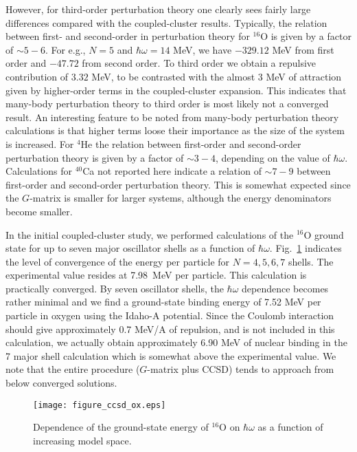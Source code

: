 \documentclass[twoside,12pt]{article}
\begin{document}
However, for third-order perturbation theory one clearly sees fairly large
differences compared with the coupled-cluster results.
Typically, the relation between first- and second-order in perturbation theory
for  $^{16}$O is given by a factor of $\sim 5-6$. For e.g., $N=5$ and
$\hbar\omega=14$ MeV, we have $-329.12$ MeV from first order and $-47.72$
from second order. To third order we obtain a repulsive contribution of
$3.32$ MeV, to be contrasted with the almost $3$ MeV of attraction given
by higher-order terms in the coupled-cluster expansion. This indicates that
many-body perturbation theory to third order is
most likely not a converged result. An interesting feature to be noted from
many-body perturbation theory calculations is that higher terms loose their
importance as the size of the system is increased. For
$^{4}$He the relation between first-order and second-order perturbation theory
is given by a factor of $\sim 3-4$, depending on the value of $\hbar\omega$.
Calculations for $^{40}$Ca not reported here indicate a relation of
$\sim 7-9$ between first-order and second-order perturbation theory.
This is somewhat expected since the $G$-matrix is smaller for larger
systems, although the energy denominators become smaller.

In the initial coupled-cluster study, we performed calculations of 
the $^{16}$O ground state for up to seven major oscillator 
shells as a function of $\hbar\omega$. 
Fig.~\ref{fig_ox_hw} indicates the level of convergence
of the energy per particle for $N=4,5,6,7$ shells. The experimental value
resides at 7.98~MeV per particle.  This calculation is practically converged.
By seven oscillator shells, the $\hbar\omega$ dependence becomes rather
minimal and we find a ground-state binding energy of 7.52 MeV per particle in
oxygen using the Idaho-A potential. Since the Coulomb interaction should give
approximately 0.7 MeV/A of repulsion, and is not included in this
calculation, we actually obtain approximately 6.90 MeV of nuclear binding
in the 7 major shell calculation which is somewhat above the experimental
value. We note that the entire procedure ($G$-matrix plus CCSD) tends to
approach from below converged solutions.

\begin{figure}
\begin{center}
\texttt{[image: figure\_ccsd\_ox.eps]}
\caption{Dependence of the ground-state energy of $^{16}$O  on $\hbar\omega$
as a function of increasing model space.}
\label{fig_ox_hw}
\end{center}
\end{figure}
\end{document}
